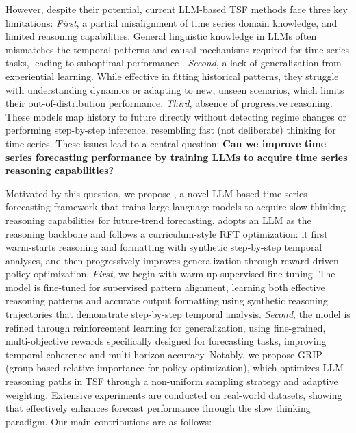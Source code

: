 However, despite their potential, current LLM-based TSF methods face three key limitations:
\textit{First}, a partial misalignment of time series domain knowledge, and limited reasoning capabilities. General linguistic knowledge in LLMs often mismatches the temporal patterns and causal mechanisms required for time series tasks, leading to suboptimal performance \citep{zhou2023one}.
\textit{Second}, a lack of generalization from experiential learning. While effective in fitting historical patterns, they struggle with understanding dynamics or adapting to new, unseen scenarios, which limits their out-of-distribution performance.
\textit{Third}, absence of progressive reasoning. These models map history to future directly without detecting regime changes or performing step-by-step inference, resembling fast (not deliberate) thinking for time series.
These issues lead to a central question: \textbf{Can we improve time series forecasting performance by training LLMs to acquire time series reasoning capabilities?} 

Motivated by this question, we propose \Ours, a novel LLM-based time series forecasting framework that trains large language models to acquire slow-thinking reasoning capabilities for future-trend forecasting. 
\Ours adopts an LLM as the reasoning backbone and follows a curriculum-style RFT optimization: it first warm-starts reasoning and formatting with synthetic step-by-step temporal analyses, and then progressively improves generalization through reward-driven policy optimization.
\textit{First}, we begin with warm-up supervised fine-tuning. The model is fine-tuned for supervised pattern alignment, learning both effective reasoning patterns and accurate output formatting using synthetic reasoning trajectories that demonstrate step-by-step temporal analysis. \textit{Second}, the model is refined through reinforcement learning for generalization, using fine-grained, multi-objective rewards specifically designed for forecasting tasks, improving temporal coherence and multi-horizon accuracy. Notably, we propose GRIP (group-based relative importance for policy optimization), which optimizes LLM reasoning paths in TSF through a non-uniform sampling strategy and adaptive weighting. Extensive experiments are conducted on real-world datasets, showing that \Ours effectively enhances forecast performance through the slow thinking paradigm. Our main contributions are as follows:

